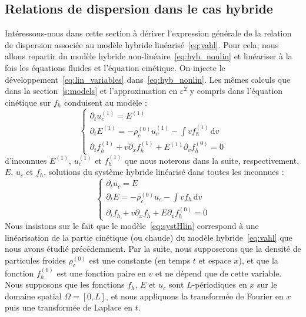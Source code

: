 \subsection{Relations de dispersion dans le cas hybride}

Intéressons-nous dans cette section à dériver l'expression générale de la relation de dispersion associée au modèle hybride linéarisé~\eqref{eq:vahl}. Pour cela, nous allons repartir du modèle hybride non-linéaire~\eqref{eq:hyb_nonlin} et linéariser à la fois les équations fluides et l'équation cinétique. On injecte le développement~\eqref{eq:lin_variables} dans~\eqref{eq:hyb_nonlin}. Les mêmes calculs que dans la section~\ref{s:models} et l'approximation en $\varepsilon^2$ y compris dans l'équation cinétique sur $f_h$ conduisent au modèle :
$$
  \begin{cases}
    \partial_tu_c^{(1)}=E^{(1)}\\
    \partial_tE^{(1)}=-\rho_c^{(0)}u_c^{(1)}-\int v f_h^{(1)}\,\mathrm{d}v\\
    \partial_t f_h^{(1)}+ v\partial_xf_h^{(1)}+ E^{(1)}\partial_vf_h^{(0)}=0
  \end{cases}
$$ 
d'inconnues $E^{(1)}$, $u_c^{(1)}$ et $f_h^{(1)}$ que nous noterons dans la suite, respectivement, $E$, $u_c$ et $f_h$, solutions du système hybride linéarisé dans toutes les inconnues :
\begin{equation}
  \begin{cases}
    \partial_t u_c = E \\
    \partial_t E = -\rho_c^{(0)}u_c - \int vf_h\,\mathrm{d}v \\
    \partial_t f_h + v\partial_x f_h + E\partial_v f_h^{(0)} = 0
  \end{cases}
\label{eq:systHlin}
\end{equation}
Nous insistons sur le fait que le modèle~\eqref{eq:systHlin} correspond à une linéarisation de la partie cinétique (ou chaude) du modèle hybride~\eqref{eq:vahl} que nous avons étudié précédemment. Par la suite, nous supposerons que la densité de particules froides $\rho_c^{(0)}$ est une constante (en temps $t$ et espace $x$), et que la fonction $f_h^{(0)}$ est une fonction paire en $v$ et ne dépend que de cette variable. Nous supposons que les fonctions $f_h$, $E$ et $u_c$ sont $L$-périodiques en $x$ sur le domaine spatial $\Omega = [0,L]$, et nous appliquons la transformée de Fourier en $x$ puis une transformée de Laplace en $t$.

